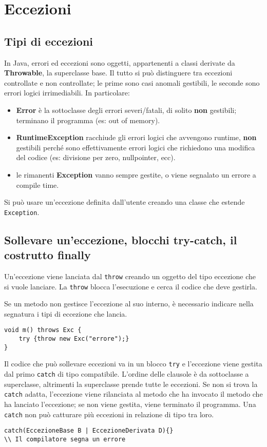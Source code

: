 \chapter{Eccezioni}

\section{Tipi di eccezioni}
In Java, errori ed eccezioni sono oggetti, appartenenti a classi derivate da \textbf{Throwable}, la superclasse base. Il tutto si può distinguere tra eccezioni controllate e non controllate; le prime sono casi anomali gestibili, le seconde sono errori logici irrimediabili.
In particolare:
\begin{itemize}
\item \textbf{Error} è la sottoclasse degli errori severi/fatali, di solito \textbf{non} gestibili; terminano il programma (es: out of memory).
\item \textbf{RuntimeException} racchiude gli errori logici che avvengono runtime, \textbf{non} gestibili perché sono effettivamente errori logici che richiedono una modifica del codice (es: divisione per zero, nullpointer, ecc).
\item le rimanenti \textbf{Exception} vanno sempre gestite, o viene segnalato un errore a compile time.
\end{itemize}
Si può usare un'eccezione definita dall'utente creando una classe che estende \texttt{Exception}.

\section{Sollevare un'eccezione, blocchi try-catch, il costrutto finally}
Un'eccezione viene lanciata dal \texttt{throw} creando un oggetto del tipo eccezione che si vuole lanciare. La \texttt{throw} blocca l'esecuzione e cerca il codice che deve gestirla.

Se un metodo non gestisce l'eccezione al suo interno, è necessario indicare nella segnatura i tipi di eccezione che lancia.
\begin{lstlisting}
void m() throws Exc {
    try {throw new Exc("errore");}
}
\end{lstlisting}

Il codice che può sollevare eccezioni va in un blocco \texttt{try} e l'eccezione viene gestita dal primo \texttt{catch} di tipo compatibile. L'ordine delle clausole è da sottoclasse a superclasse, altrimenti la superclasse prende tutte le eccezioni. Se non si trova la \texttt{catch} adatta, l'eccezione viene rilanciata al metodo che ha invocato il metodo che ha lanciato l'eccezione; se non viene gestita, viene terminato il programma. Una \texttt{catch} non può catturare più eccezioni in relazione di tipo tra loro.
\begin{lstlisting}
catch(EccezioneBase B | EccezioneDerivata D){}
\\ Il compilatore segna un errore
\end{lstlisting}


